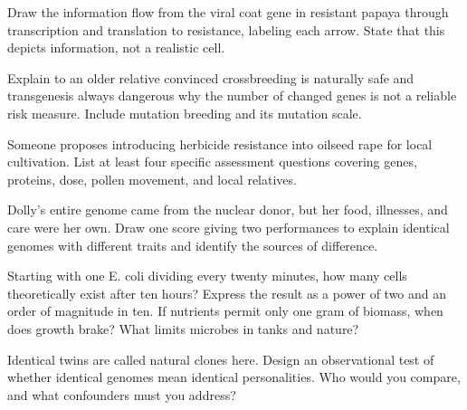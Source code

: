 \begin{sikaoti}
\item Draw the information flow from the viral coat gene in resistant papaya through transcription and translation to resistance, labeling each arrow. State that this depicts information, not a realistic cell.
\item Explain to an older relative convinced crossbreeding is naturally safe and transgenesis always dangerous why the number of changed genes is not a reliable risk measure. Include mutation breeding and its mutation scale.
\item Someone proposes introducing herbicide resistance into oilseed rape for local cultivation. List at least four specific assessment questions covering genes, proteins, dose, pollen movement, and local relatives.
\item Dolly's entire genome came from the nuclear donor, but her food, illnesses, and care were her own. Draw one score giving two performances to explain identical genomes with different traits and identify the sources of difference.
\item Starting with one E. coli dividing every twenty minutes, how many cells theoretically exist after ten hours? Express the result as a power of two and an order of magnitude in ten. If nutrients permit only one gram of biomass, when does growth brake? What limits microbes in tanks and nature?
\item Identical twins are called natural clones here. Design an observational test of whether identical genomes mean identical personalities. Who would you compare, and what confounders must you address?
\end{sikaoti}
